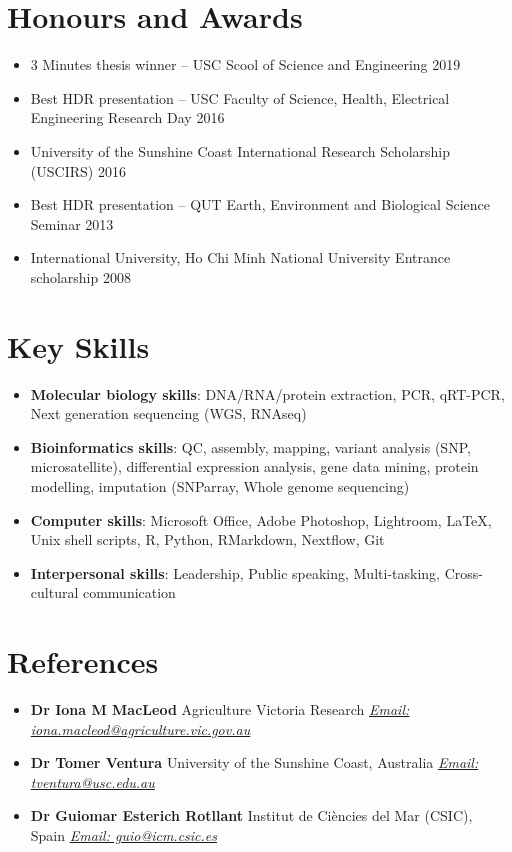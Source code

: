 \documentclass[letterpaper,11pt]{article}
\newcommand{\resumeItem}[2]{
  \item\small{
    \textbf{#1}{: #2 \vspace{0pt}}
  }
}
\newcommand{\resumeRef}[2]{
  \item\small{
    \textbf{#1} {#2}}
  }
\newcommand{\resumeBlack}[1]{\item\small{{#1}}}
\newcommand{\resumeSubItem}[2]{\resumeItem{#1}{#2}}
\newcommand{\resumeItemListStart}{\begin{itemize}}
\newcommand{\resumeItemListEnd}{\end{itemize}}
\begin{document}
\section{Honours and Awards}
\resumeItemListStart
	\resumeBlack{3 Minutes thesis winner – USC Scool of Science and Engineering 2019}
	\resumeBlack{Best HDR presentation – USC Faculty of Science, Health, Electrical Engineering Research Day 2016}
    \resumeBlack{University of the Sunshine Coast International Research Scholarship (USCIRS) 2016}
    \resumeBlack{Best HDR presentation –  QUT Earth, Environment and Biological Science Seminar 2013}
    \resumeBlack{International University, Ho Chi Minh National University Entrance scholarship 2008}
\resumeItemListEnd  

\section{Key Skills}
 \resumeItemListStart
    \resumeSubItem{Molecular biology skills}{DNA/RNA/protein extraction, PCR, qRT-PCR, Next generation sequencing (WGS, RNAseq)}
    \resumeSubItem{Bioinformatics skills}{QC, assembly, mapping, variant analysis (SNP, microsatellite), differential expression analysis, gene data mining, protein modelling, imputation (SNParray, Whole genome sequencing)}
    \resumeSubItem{Computer skills}{Microsoft Office, Adobe Photoshop, Lightroom, LaTeX, Unix shell scripts, R, Python, RMarkdown, Nextflow, Git}
    \resumeSubItem{Interpersonal skills}{Leadership, Public speaking, Multi-tasking, Cross-cultural communication}
  \resumeItemListEnd

\section{References}
 \resumeItemListStart
    \resumeRef{Dr Iona M MacLeod}  {Agriculture Victoria Research} \href{mailto:iona.mcleod@agriculture.vic.gov.au}{\textit{Email: iona.macleod@agriculture.vic.gov.au}}
    \resumeRef{Dr Tomer Ventura}  {University of the Sunshine Coast, Australia} \href{mailto:tventura@usc.edu.au}{\textit{Email: tventura@usc.edu.au}} 
    \resumeRef{Dr Guiomar Esterich Rotllant}  {Institut de Ciències del Mar (CSIC), Spain} \href{mailto:guio@icm.csic.es}{\textit{Email: guio@icm.csic.es}} 
  \resumeItemListEnd
  
\end{document}
